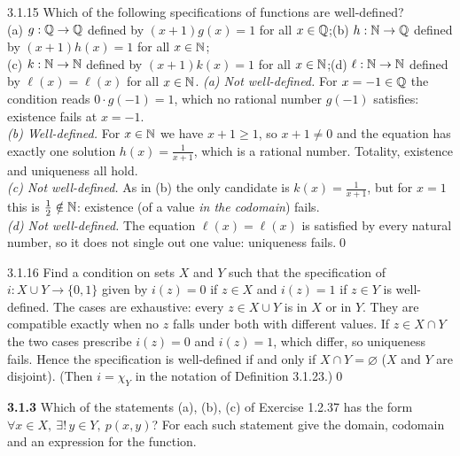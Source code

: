 \begin{bookex}[essential (a)--(c)]{3.1.15}
Which of the following specifications of functions are well-defined?\\
(a) $g:\mathbb{Q}\to\mathbb{Q}$ defined by $(x+1)g(x)=1$ for all $x\in\mathbb{Q}$;\quad (b) $h:\mathbb{N}\to\mathbb{Q}$ defined by $(x+1)h(x)=1$ for all $x\in\mathbb{N}$;\\
(c) $k:\mathbb{N}\to\mathbb{N}$ defined by $(x+1)k(x)=1$ for all $x\in\mathbb{N}$;\quad (d) $\ell:\mathbb{N}\to\mathbb{N}$ defined by $\ell(x)=\ell(x)$ for all $x\in\mathbb{N}$.
\solution
\emph{(a) Not well-defined.} For $x=-1\in\mathbb{Q}$ the condition reads $0\cdot g(-1)=1$, which no rational number $g(-1)$ satisfies: existence fails at $x=-1$.\\
\emph{(b) Well-defined.} For $x\in\mathbb{N}$ we have $x+1\ge1$, so $x+1\ne0$ and the equation has exactly one solution $h(x)=\frac1{x+1}$, which is a rational number. Totality, existence and uniqueness all hold.\\
\emph{(c) Not well-defined.} As in (b) the only candidate is $k(x)=\frac1{x+1}$, but for $x=1$ this is $\frac12\notin\mathbb{N}$: existence (of a value \emph{in the codomain}) fails.\\
\emph{(d) Not well-defined.} The equation $\ell(x)=\ell(x)$ is satisfied by every natural number, so it does not single out one value: uniqueness fails.\qed
\end{bookex}

\begin{bookex}[recommended]{3.1.16}
Find a condition on sets $X$ and $Y$ such that the specification of $i:X\cup Y\to\{0,1\}$ given by $i(z)=0$ if $z\in X$ and $i(z)=1$ if $z\in Y$ is well-defined.
\solution
The cases are exhaustive: every $z\in X\cup Y$ is in $X$ or in $Y$. They are compatible exactly when no $z$ falls under both with different values. If $z\in X\cap Y$ the two cases prescribe $i(z)=0$ and $i(z)=1$, which differ, so uniqueness fails. Hence the specification is well-defined if and only if $X\cap Y=\varnothing$ ($X$ and $Y$ are disjoint). (Then $i=\chi_Y$ in the notation of Definition 3.1.23.)\qed
\end{bookex}

\begin{trybox}[{3.1.3 \fO}]
\textbf{3.1.3} Which of the statements (a), (b), (c) of Exercise 1.2.37 has the form $\forall x\in X,\ \exists!\,y\in Y,\ p(x,y)$? For each such statement give the domain, codomain and an expression for the function.
\end{trybox}

